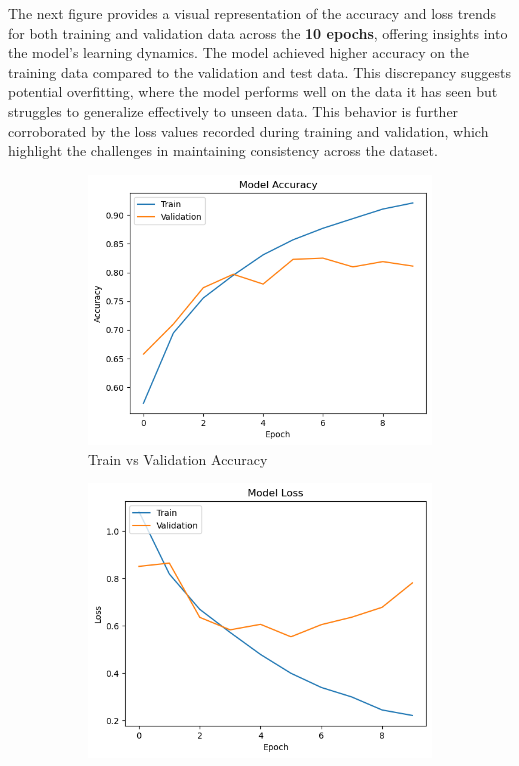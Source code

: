 The next figure provides a visual representation of the accuracy and loss trends for both training and validation data across the \textbf{10 epochs}, offering insights into the model's learning dynamics.
The model achieved higher accuracy on the training data compared to the validation and test data. This discrepancy suggests potential overfitting, where the model performs well on the data it has seen but struggles to generalize effectively to unseen data. This behavior is further corroborated by the loss values recorded during training and validation, which highlight the challenges in maintaining consistency across the dataset.

\begin{figure}[h!]
    \centering
    \begin{subfigure}[t]{0.45\textwidth} %
        \centering
        \includegraphics[width=\textwidth]{images/model_class_accuracy.png}
        \caption{Train vs Validation Accuracy}
        \label{fig:subfig1}
    \end{subfigure}
    \hfill
    \begin{subfigure}[t]{0.45\textwidth}
        \centering
        \includegraphics[width=\textwidth]{images/model_class_loss.png}

\end{subfigure}
\end{figure}
